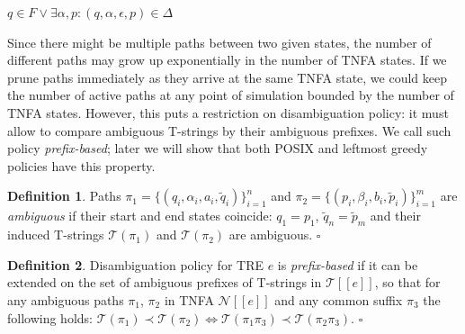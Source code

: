 \documentclass{article}
\newcommand{\Xin}{\!\in\!}
\newcommand{\Xeq}{\!=\!}
\newcommand{\Xlb}{[\![}
\newcommand{\Xrb}{]\!]}
\newcommand{\XN}{\mathcal{N}}
\newcommand{\XT}{\mathcal{T}}
\theoremstyle{definition}
\newtheorem{Xdef}{Definition}
\begin{document}
\begin{multicols}{2}
    \begin{algorithm}[H] \DontPrintSemicolon {} 
     {
        \Return $q \Xin F \vee \exists \alpha, p: (q, \alpha, \epsilon, p) \Xin \Delta$
    }
    \end{algorithm}

Since there might be multiple paths between two given states,
the number of different paths may grow up exponentially in the number of TNFA states.
If we prune paths immediately as they arrive at the same TNFA state,
we could keep the number of active paths at any point of simulation bounded by the number of TNFA states.
However, this puts a restriction on disambiguation policy:
it must allow to compare ambiguous T-strings by their ambiguous prefixes.
We call such policy \emph{prefix-based};
later we will show that both POSIX and leftmost greedy policies have this property.

    \begin{Xdef}
    Paths
    $\pi_1 \Xeq \{(q_i, \alpha_i, a_i, \widetilde{q}_i)\}_{i=1}^n$ and
    $\pi_2 \Xeq \{(p_i, \beta_i, b_i, \widetilde{p}_i)\}_{i=1}^m$
    are \emph{ambiguous} if their start and end states coincide: $q_1 \Xeq p_1$, $\widetilde{q}_n \Xeq \widetilde{p}_m$
    and their induced T-strings $\XT(\pi_1)$ and $\XT(\pi_2)$ are ambiguous.
    $\square$
    \end{Xdef}

    \begin{Xdef}
    Disambiguation policy for TRE $e$ is \emph{prefix-based}
    if it can be extended on the set of ambiguous prefixes of T-strings in $\XT \Xlb e \Xrb$,
    so that for any ambiguous paths $\pi_1 $, $\pi_2 $ in TNFA $\XN \Xlb e \Xrb$
    and any common suffix $\pi_3$ the following holds:
    $\XT(\pi_1) \prec \XT(\pi_2) \Leftrightarrow \XT(\pi_1 \pi_3) \prec \XT(\pi_2 \pi_3)$.
    $\square$
    \end{Xdef}


\end{multicols}
\end{document}

